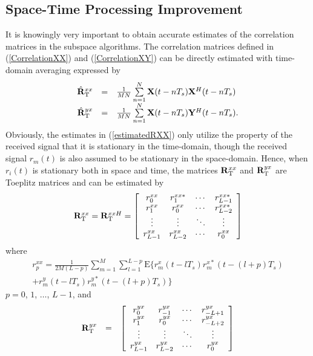 \documentclass[conference]{IEEEtran}
\newcommand{\bX}{{\bf X}}
\newcommand{\bY}{{\bf Y}}
\begin{document}
\subsection{Space-Time Processing Improvement}
It is knowingly very important to obtain accurate estimates of the
correlation matrices in the subspace algorithms. The correlation
matrices defined in (\ref{CorrelationXX}) and
(\ref{CorrelationXY}) can be directly estimated with time-domain
averaging expressed by
\begin{equation}
\begin{array}{rcl}
\hat{\mathbf{R}}_{\rm T}^{xx}&=&\frac{1}{MN}\sum\limits_{n=1}^{N}\bX(t-nT_s)\bX^{H}(t-nT_s)\\
\hat{\mathbf{R}}_{\rm
T}^{yx}&=&\frac{1}{MN}\sum\limits_{n=1}^{N}\bX(t-nT_s)\bY^{H}(t-nT_s).
\end{array}\label{estimatedRXX}\label{estimatedRYX}
\end{equation}
\noindent Obviously, the estimates in (\ref{estimatedRXX}) only
utilize the property of the received signal that it is stationary
in the time-domain, though the received signal $r_m(t)$ is also
assumed to be stationary in the space-domain. Hence, when $r_i(t)$
is stationary both in space and time, the matrices
$\mathbf{R}_{\rm T}^{xx}$ and $\mathbf{R}_{\rm T}^{yx}$ are
Toeplitz matrices and can be estimated by
\begin{equation}
\begin{array}{l}
\mathbf{R}_{\rm T}^{xx}=\mathbf{R}_{\rm
T}^{xxH}=\left[\begin{array}{cccc} r_0^{xx} & r_1^{xx\ast} &
\cdots & r_{L-1}^{xx\ast}\\ r_1^{xx} & r_0^{xx} &
\cdots & r_{L-2}^{xx\ast}\\ \vdots & \vdots & \ddots & \vdots\\
r_{L-1}^{xx} & r_{L-2}^{xx} & \cdots & r_0^{xx}
\end{array}\right]
\end{array}
\end{equation}
\noindent where
\begin{equation}
\begin{array}{r}
r_p^{xx}=\frac{1}{2M(L-p)}\sum\limits_{m=1}^{M}\sum\limits_{l=1}^{L-p}\mbox{E}\{r_m^x(t-lT_s)r_m^{x\ast}(t-(l+p)T_s)\\
+r_m^y(t-lT_s)r_m^{y\ast}(t-(l+p)T_s)\}
\end{array}
\end{equation}
\noindent $p=0$, $1$, $\ldots$, $L-1$, and
\begin{equation}
\begin{array}{rll}
\mathbf{R}_{\rm T}^{yx}&=&\left[\begin{array}{cccc} r_0^{yx} &
r_{-1}^{yx} & \cdots & r_{-L+1}^{yx}\\ r_1^{yx} & r_0^{yx} &
\cdots & r_{-L+2}^{yx}\\ \vdots & \vdots & \ddots & \vdots\\
r_{L-1}^{yx} & r_{L-2}^{yx} & \cdots & r_0^{yx}
\end{array}\right]
\end{array}
\end{equation}
\end{document}
